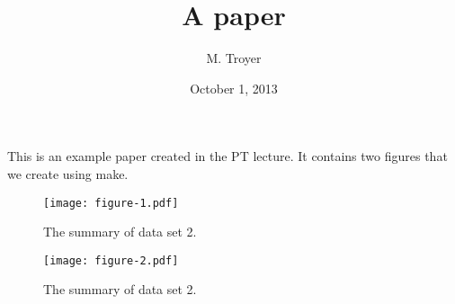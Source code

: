 \documentclass[twocolumn]{article}
\begin{document}
\title{A paper}
\author{M. Troyer}
\date{October 1, 2013}
\maketitle

This is an example paper created in the PT lecture. It contains two figures that we create using make.

\begin{figure}
\texttt{[image: figure-1.pdf]}
\caption{The summary of data set 2.}
\end{figure}

\begin{figure}
\texttt{[image: figure-2.pdf]}
\caption{The summary of data set 2.}
\end{figure}
\end{document}
